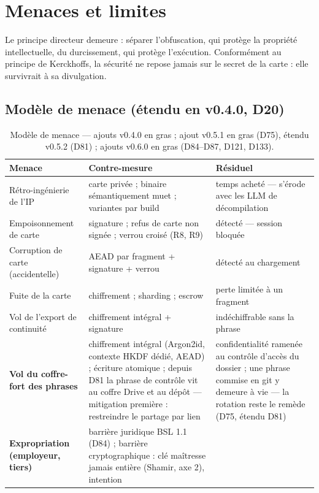 \section{Menaces et limites}\label{sec:menaces}

Le principe directeur demeure : séparer l'obfuscation, qui protège la propriété
intellectuelle, du durcissement, qui protège l'exécution. Conformément au principe de
Kerckhoffs, la sécurité ne repose jamais sur le secret de la carte : elle survivrait à sa
divulgation.

\subsection{Modèle de menace (étendu en v0.4.0, D20)}

\begin{table}[htbp]
\centering\small
\caption{Modèle de menace — ajouts v0.4.0 en gras ; ajout v0.5.1 en gras (D75), étendu v0.5.2 (D81) ; ajouts v0.6.0 en gras (D84--D87, D121, D133).}
\label{tab:menaces}
\begin{tabularx}{\textwidth}{@{}Y Y Y@{}}
\toprule
\textbf{Menace} & \textbf{Contre-mesure} & \textbf{Résiduel} \\
\midrule
Rétro-ingénierie de l'IP & carte privée ; binaire sémantiquement muet ; variantes par
build & temps acheté — s'érode avec les LLM de décompilation \\
Empoisonnement de carte & signature ; refus de carte non signée ; verrou croisé (R8, R9)
& détecté — session bloquée \\
Corruption de carte (accidentelle) & AEAD par fragment + signature + verrou & détecté au
chargement \\
Fuite de la carte & chiffrement ; sharding ; escrow & perte limitée à un fragment \\
Vol de l'export de continuité & chiffrement intégral + signature & indéchiffrable sans
la phrase \\
\textbf{Vol du coffre-fort des phrases} & chiffrement intégral (Argon2id, contexte
HKDF dédié, AEAD) ; écriture atomique ; depuis D81 la phrase de contrôle vit au coffre
Drive et au dépôt — mitigation première : restreindre le partage par lien & confidentialité
ramenée au contrôle d'accès du dossier ; une phrase commise en git y demeure à vie — la
rotation reste le remède (D75, étendu D81) \\
\textbf{Expropriation (employeur, tiers)} & barrière juridique BSL 1.1 (D84) ;
barrière cryptographique : clé maîtresse jamais entière (Shamir, axe 2), intention

\end{tabularx}
\end{table}
